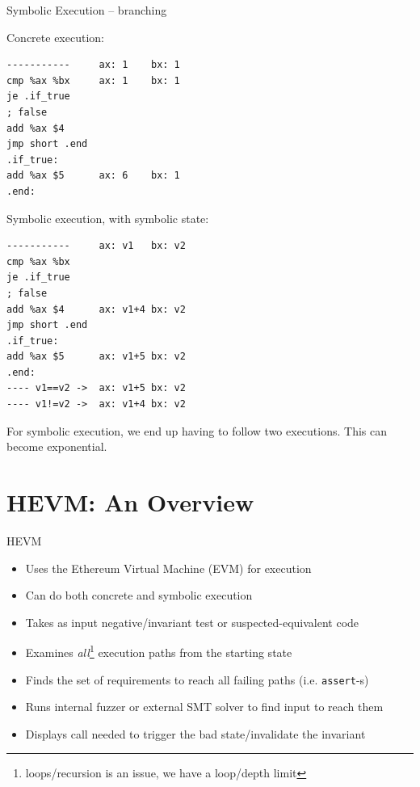 \documentclass[aspectratio=169]{beamer}
\begin{document}
\begin{frame}[fragile=singleslide]{Symbolic Execution -- branching}
\begin{minipage}[t]{0.45\textwidth}
Concrete execution:
\begin{Verbatim}[fontsize=\small]
-----------     ax: 1    bx: 1
cmp %ax %bx     ax: 1    bx: 1
je .if_true     
; false
add %ax $4
jmp short .end
.if_true:
add %ax $5      ax: 6    bx: 1
.end:
\end{Verbatim}
\end{minipage}%
\begin{minipage}[t]{0.45\textwidth}
Symbolic execution, with symbolic state:
\begin{Verbatim}[fontsize=\small]
-----------     ax: v1   bx: v2
cmp %ax %bx     
je .if_true     
; false
add %ax $4      ax: v1+4 bx: v2
jmp short .end
.if_true:
add %ax $5      ax: v1+5 bx: v2
.end:
---- v1==v2 ->  ax: v1+5 bx: v2
---- v1!=v2 ->  ax: v1+4 bx: v2
\end{Verbatim}
\end{minipage}
\bigskip

For symbolic execution, we end up having to follow two executions. This can become exponential.

\end{frame}

\section{HEVM: An Overview}
\begin{frame}{HEVM}
\begin{itemize}
\item Uses the Ethereum Virtual Machine (EVM) for execution
\item Can do both concrete and symbolic execution
\item Takes as input negative/invariant test or suspected-equivalent code
\item Examines \emph{all}\footnote{loops/recursion is an issue, we have a loop/depth limit} execution paths from the starting state
\item Finds the set of requirements to reach all failing paths (i.e. \texttt{assert}-s)
\item Runs internal fuzzer or external SMT solver to find input to reach them
\item Displays call needed to trigger the bad state/invalidate the invariant
\end{itemize}
\end{frame}
\end{document}
